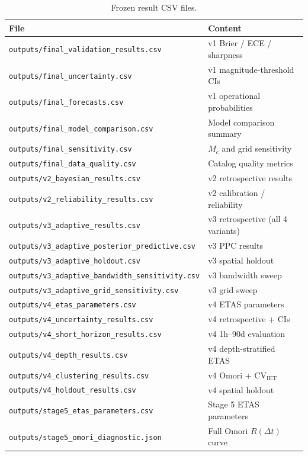 \documentclass[10pt,a4paper,twocolumn]{article}
\begin{document}
\begin{table}[t]
\centering
\caption{Frozen result CSV files.}\label{tab:frozen-csvs}
\small
\begin{tabular*}{\columnwidth}{@{\extracolsep{\fill}}ll}
\toprule
File & Content \\
\midrule
\texttt{outputs/final\_validation\_results.csv} & v1 Brier / ECE / sharpness \\
\texttt{outputs/final\_uncertainty.csv} & v1 magnitude-threshold CIs \\
\texttt{outputs/final\_forecasts.csv} & v1 operational probabilities \\
\texttt{outputs/final\_model\_comparison.csv} & Model comparison summary \\
\texttt{outputs/final\_sensitivity.csv} & $M_c$ and grid sensitivity \\
\texttt{outputs/final\_data\_quality.csv} & Catalog quality metrics \\
\texttt{outputs/v2\_bayesian\_results.csv} & v2 retrospective results \\
\texttt{outputs/v2\_reliability\_results.csv} & v2 calibration / reliability \\
\texttt{outputs/v3\_adaptive\_results.csv} & v3 retrospective (all 4 variants) \\
\texttt{outputs/v3\_adaptive\_posterior\_predictive.csv} & v3 PPC results \\
\texttt{outputs/v3\_adaptive\_holdout.csv} & v3 spatial holdout \\
\texttt{outputs/v3\_adaptive\_bandwidth\_sensitivity.csv} & v3 bandwidth sweep \\
\texttt{outputs/v3\_adaptive\_grid\_sensitivity.csv} & v3 grid sweep \\
\texttt{outputs/v4\_etas\_parameters.csv} & v4 ETAS parameters \\
\texttt{outputs/v4\_uncertainty\_results.csv} & v4 retrospective + CIs \\
\texttt{outputs/v4\_short\_horizon\_results.csv} & v4 1h--90d evaluation \\
\texttt{outputs/v4\_depth\_results.csv} & v4 depth-stratified ETAS \\
\texttt{outputs/v4\_clustering\_results.csv} & v4 Omori + CV$_{\text{IET}}$ \\
\texttt{outputs/v4\_holdout\_results.csv} & v4 spatial holdout \\
\texttt{outputs/stage5\_etas\_parameters.csv} & Stage 5 ETAS parameters \\
\texttt{outputs/stage5\_omori\_diagnostic.json} & Full Omori $R(\Delta t)$ curve \\
\bottomrule
\end{tabular*}
\end{table}
\end{document}
